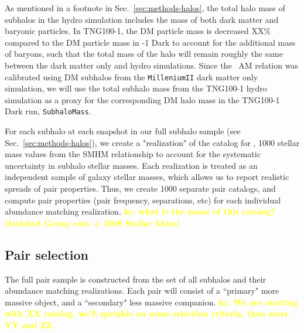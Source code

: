 \documentclass[twocolumn]{aastex631}
\newcommand{\kc}[1]{\textcolor{yellow}{\textbf{kc: #1}} }
\begin{document}
    As mentioned in a footnote in Sec.~\ref{sec:methods-halos}, the total halo mass of subhalos in the hydro simulation includes the mass of both dark matter and baryonic particles. 
    In TNG100-1, the DM particle mass is decreased XX\% compared to the DM particle mass in -1 Dark to account for the additional mass of baryons, such that the total mass of the halo will remain roughly the same between the dark matter only and hydro simulations. 
    Since the~\citet{Moster2013} AM relation was calibrated using DM subhalos from the \texttt{MilleniumII} dark matter only simulation, we will use the total subhalo mass from the TNG100-1 hydro simulation as a proxy for the corresponding DM halo mass in the TNG100-1 Dark run, \texttt{SubhaloMass}. 

    For each subhalo at each snapshot in our full subhalo sample (see Sec.~\ref{sec:methods-halos}), we create a "realization" of the catalog for , 1000 stellar mass values from the SMHM relationship to account for the systematic uncertainty in subhalo stellar masses.
    Each realization is treated as an independent sample of galaxy stellar masses, which allows us to report realistic spreads of pair properties.
    Thus, we create 1000 separate pair catalogs, and compute pair properties (pair frequency, separations, etc) for each individual abundance matching realization.
    \kc{what is the name of this catalog? (Isolated Group cats + 1000 Stellar Mass) }


    \subsection{Pair selection}\label{sec:methods-pairs}
    The full pair sample is constructed from the set of all subhalos and their abundance matching realizations. Each pair will consist of a ``primary" more massive object, and a ``secondary" less massive companion. 
    \kc{We are starting with XX catalog, we'll sprinkle on some selection criteria, then store YY and ZZ. }

\end{document}
